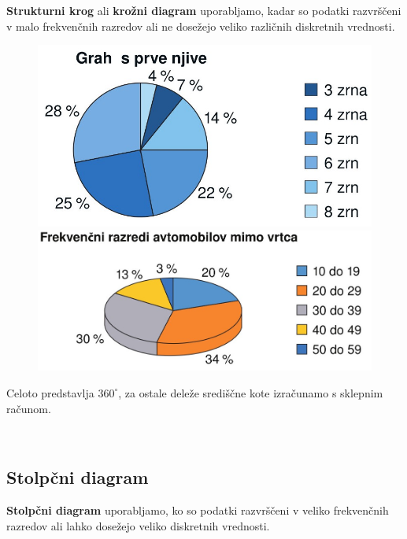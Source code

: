                 \textbf{Strukturni krog} ali \textbf{krožni diagram} uporabljamo, kadar so podatki razvrščeni v malo frekvenčnih razredov 
                ali ne dosežejo veliko različnih diskretnih vrednosti.
            
                \begin{figure}[H]
                    \includegraphics[scale=0.3]{../Slike_in_skice/10921.jpg}
                    \includegraphics[scale=0.3]{../Slike_in_skice/1092.jpg}
                \end{figure}

            
                Celoto predstavlja $360^\circ$, za ostale deleže središčne kote izračunamo s sklepnim računom.
            
                ~

            \subsection*{Stolpčni diagram}

                \textbf{Stolpčni diagram} uporabljamo, ko so podatki razvrščeni v veliko frekvenčnih razredov
                ali lahko dosežejo veliko diskretnih vrednosti.
                
                ~
                    
